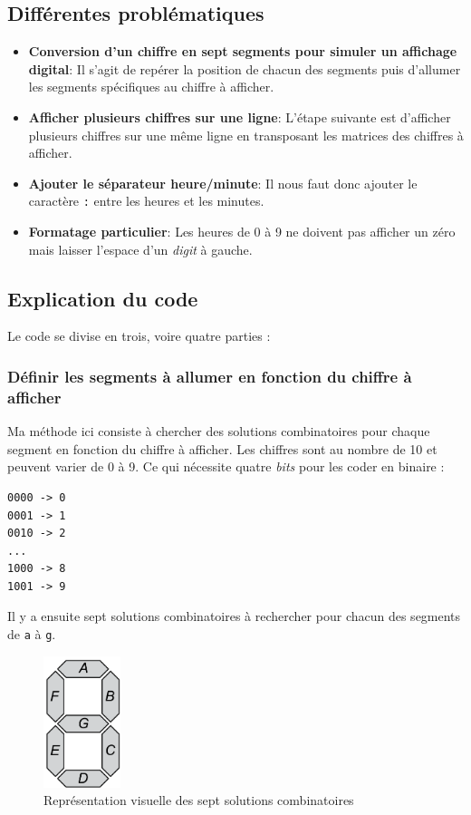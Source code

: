 \subsection*{Différentes problématiques}
\begin{itemize}
	\item[\textbullet] \textbf{Conversion d'un chiffre en sept segments pour simuler un affichage digital}: Il s'agit de repérer la position de chacun des segments puis \og d'allumer\fg{} les segments spécifiques au chiffre à afficher.
	\medskip
	
	\item[\textbullet] \textbf{Afficher plusieurs chiffres sur une ligne}: L'étape suivante est d'afficher plusieurs chiffres sur une même ligne en transposant les \og matrices\fg{} des chiffres à afficher.
	\medskip
	
	\item[\textbullet] \textbf{Ajouter le séparateur heure/minute}: Il nous faut donc ajouter le caractère \og \texttt{:}\fg{} entre les heures et les minutes.
	\medskip
	
	\item[\textbullet] \textbf{Formatage particulier}: Les heures de 0 à 9 ne doivent pas afficher un zéro mais laisser l'espace d'un \textit{digit} à gauche.
\end{itemize}
\medskip

\subsection*{Explication du code}
Le code se divise en trois, voire quatre parties :
\medskip

\subsubsection*{\textbullet{} Définir les segments à allumer en fonction du chiffre à afficher}
Ma méthode ici consiste à chercher des solutions combinatoires pour chaque segment en fonction du chiffre à afficher. Les chiffres sont au nombre de 10 et peuvent varier de 0 à 9. Ce qui nécessite quatre \textit{bits} pour les coder en binaire :
\begin{verbatim}
0000 -> 0
0001 -> 1
0010 -> 2
...
1000 -> 8
1001 -> 9
\end{verbatim}
\medskip

Il y a ensuite sept solutions combinatoires à rechercher pour chacun des segments de \og \texttt{a}\fg{} à \og \texttt{g}\fg{}.
\begin{figure}[h]
    \centering
    \includegraphics[width=0.2\textwidth]{IMG/sept_segments.png}
    \caption{Représentation visuelle des sept solutions combinatoires}
    \label{fig:colorpicker}
\end{figure}
\medskip

